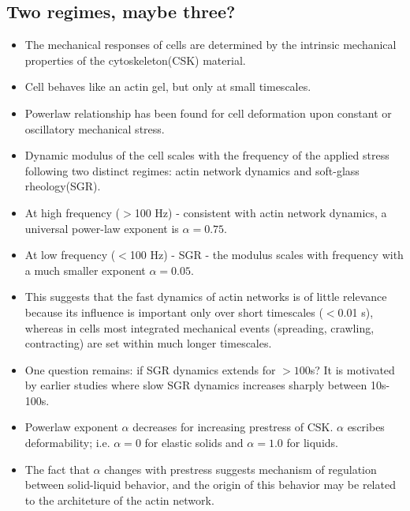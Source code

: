 \documentclass[10pt,a4paper]{article}
\begin{document}
 \subsection{Two regimes, maybe three? \cite{ds06}}
 \begin{itemize}
  \item The mechanical responses of cells are determined by the intrinsic mechanical properties of the cytoskeleton(CSK) material.
  \item Cell behaves like an actin gel, but only at small timescales.
  \item Powerlaw relationship has been found for cell deformation upon constant or oscillatory  mechanical stress. 
  \item Dynamic modulus of the cell scales with the frequency of the applied stress following two distinct regimes: actin network dynamics and soft-glass rheology(SGR).
  \item At high frequency ($>$100 Hz) - consistent with actin network dynamics, a universal power-law exponent is $\alpha=0.75$.
  \item At low frequency ($<$100 Hz) - SGR -  the modulus scales with frequency with a much smaller exponent $\alpha=0.05$.
  \item  This suggests that the fast dynamics of actin networks is of little relevance because its influence is important only over 
  short timescales ($<$0.01 s), whereas in cells most integrated mechanical events (spreading, crawling, contracting) are set within much longer timescales.
  \item One question remains: if SGR dynamics extends for $>100$s? It is motivated by earlier studies where slow SGR dynamics increases sharply between 10s-100s.
  \item Powerlaw exponent $\alpha$ decreases for increasing prestress of CSK. $\alpha$ escribes deformability; i.e. $\alpha=0$ for elastic solids
  and $\alpha=1.0$ for liquids.
  \item The fact that $\alpha$ changes with prestress suggests mechanism of regulation between solid-liquid behavior, and the origin of this behavior 
  may be related to the architeture of the actin network.

 \end{itemize}
 
\end{document}
